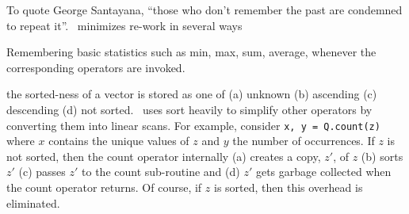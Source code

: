 To quote George Santayana, ``those who don't remember the past are condemned to
repeat it''.  \Q\ minimizes re-work in several ways
\be
\item 
Remembering basic statistics such as min, max, sum, average, whenever the
corresponding operators are invoked. 
\item the sorted-ness of a vector is
stored as one of (a) unknown (b) ascending (c) descending (d) not sorted. \Q\
uses sort heavily to simplify other operators by converting them into linear
scans. For example, consider {\tt x, y  = Q.count(z)} where \(x\) contains the
unique values of \(z\) and \(y\) the number of occurrences. If \(z\) is not
sorted, then the count operator internally (a) creates a copy, \(z'\), of \(z\)
(b) sorts \(z'\) (c) passes \(z'\) to the count sub-routine and (d) \(z'\) gets
garbage collected when the count operator returns. Of course, if \(z\) is
sorted, then this overhead is eliminated.

\ee
